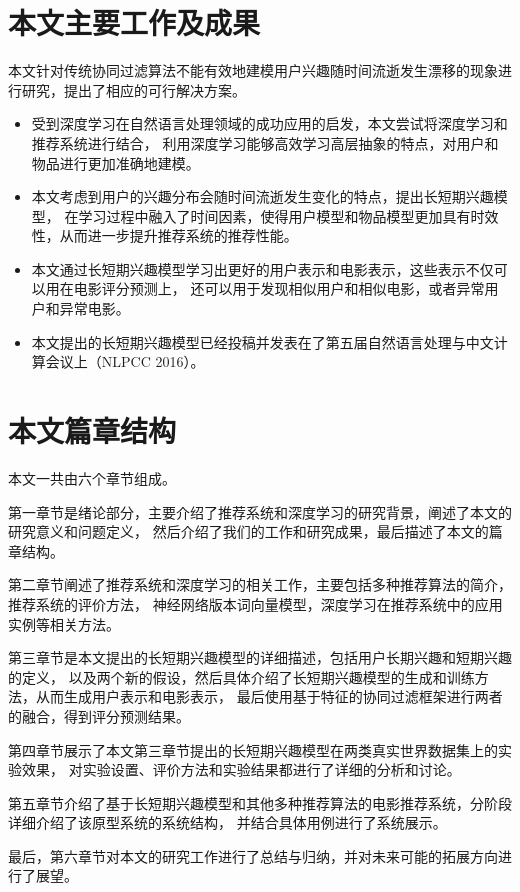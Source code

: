 \section{本文主要工作及成果}
本文针对传统协同过滤算法不能有效地建模用户兴趣随时间流逝发生漂移的现象进行研究，提出了相应的可行解决方案。
\begin{itemize}
\item
受到深度学习在自然语言处理领域的成功应用的启发，本文尝试将深度学习和推荐系统进行结合，
利用深度学习能够高效学习高层抽象的特点，对用户和物品进行更加准确地建模。
\item
本文考虑到用户的兴趣分布会随时间流逝发生变化的特点，提出长短期兴趣模型，
在学习过程中融入了时间因素，使得用户模型和物品模型更加具有时效性，从而进一步提升推荐系统的推荐性能。
\item
本文通过长短期兴趣模型学习出更好的用户表示和电影表示，这些表示不仅可以用在电影评分预测上，
还可以用于发现相似用户和相似电影，或者异常用户和异常电影。
\item
本文提出的长短期兴趣模型已经投稿并发表在了第五届自然语言处理与中文计算会议上（NLPCC 2016）。
\end{itemize}

\section{本文篇章结构}
本文一共由六个章节组成。

第一章节是绪论部分，主要介绍了推荐系统和深度学习的研究背景，阐述了本文的研究意义和问题定义，
然后介绍了我们的工作和研究成果，最后描述了本文的篇章结构。

第二章节阐述了推荐系统和深度学习的相关工作，主要包括多种推荐算法的简介，推荐系统的评价方法，
神经网络版本词向量模型，深度学习在推荐系统中的应用实例等相关方法。

第三章节是本文提出的长短期兴趣模型的详细描述，包括用户长期兴趣和短期兴趣的定义，
以及两个新的假设，然后具体介绍了长短期兴趣模型的生成和训练方法，从而生成用户表示和电影表示，
最后使用基于特征的协同过滤框架进行两者的融合，得到评分预测结果。

第四章节展示了本文第三章节提出的长短期兴趣模型在两类真实世界数据集上的实验效果，
对实验设置、评价方法和实验结果都进行了详细的分析和讨论。

第五章节介绍了基于长短期兴趣模型和其他多种推荐算法的电影推荐系统，分阶段详细介绍了该原型系统的系统结构，
并结合具体用例进行了系统展示。

最后，第六章节对本文的研究工作进行了总结与归纳，并对未来可能的拓展方向进行了展望。


